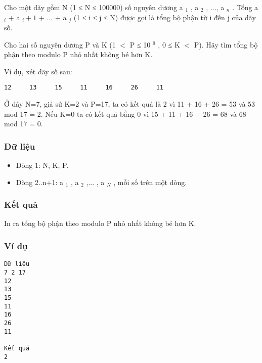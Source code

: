



   Cho một dãy gồm N (1 ≤ N ≤ 100000) số nguyên dương a   $_    1   $   , a   $_    2   $   , ..., a   $_    n   $   . Tổng a   $_    i   $   + a   $_    i+1   $   + ... + a   $_    j   $   (1 ≤ i ≤ j ≤ N) được gọi là tổng bộ phận từ i đến j của dãy số.  

   Cho hai số nguyên dương P và K (1 $<$ P ≤ 10   $^    9   $   , 0 ≤ K $<$ P). Hãy tìm tổng bộ phận theo modulo P nhỏ nhất không bé hơn K.  

   Ví dụ, xét dãy số sau:  
\begin{verbatim}
12     13     15     11     16     26     11
\end{verbatim}

   Ở đây N=7, giả sử K=2 và P=17, ta có kết quả là 2 vì 11 + 16 + 26 = 53 và 53 mod 17 = 2. Nếu K=0 ta có kết quả bằng 0 vì 15 + 11 + 16 + 26 = 68 và 68 mod 17 = 0.  

\subsubsection{   Dữ liệu  }
\begin{itemize}
	\item     Dòng 1: N, K, P.   
	\item     Dòng 2..n+1: a    $_     1    $    , a    $_     2    $    ,... , a    $_     N    $    , mỗi số trên một dòng.   
\end{itemize}

\subsubsection{   Kết quả  }

   In ra tổng bộ phận theo modulo P nhỏ nhất không bé hơn K.  

\subsubsection{   Ví dụ  }
\begin{verbatim}
Dữ liệu
7 2 17
12
13
15
11
16
26
11

Kết quả
2
\end{verbatim}